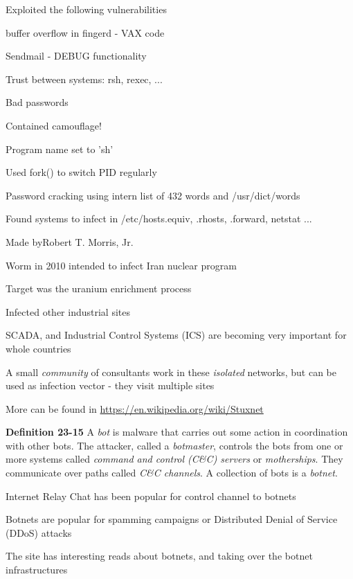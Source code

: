 \documentclass[Screen16to9,17pt]{foils}
\begin{document}

\begin{list1}
\item Exploited the following vulnerabilities
\begin{list2}
\item buffer overflow in fingerd - VAX code
\item Sendmail - DEBUG functionality
\item Trust between systems: rsh, rexec, ...
\item Bad passwords
\end{list2}
\item Contained camouflage!
\begin{list2}
\item Program name set to 'sh'
\item Used fork() to switch PID regularly
\item Password cracking using intern list of 432 words and /usr/dict/words
\item Found systems to infect in /etc/hosts.equiv, .rhosts, .forward, netstat ...
\end{list2}
\item Made byRobert T. Morris, Jr.
\end{list1}



\begin{list1}
\item Worm in 2010 intended to infect Iran nuclear program
\item Target was the uranium enrichment process
\item Infected other industrial sites
\item SCADA, and Industrial Control Systems (ICS) are becoming very important for whole countries
\item A small \emph{community} of consultants work in these \emph{isolated} networks, but can be used as infection vector - they visit multiple sites
\item More can be found in \url{https://en.wikipedia.org/wiki/Stuxnet}
\end{list1}





\begin{list1}
\item {\bf Definition 23-15} A \emph{bot} is malware that carries out some action in coordination with other bots. The attacker, called a \emph{botmaster}, controls the bots from one or more systems called \emph{command and control (C\&C) servers} or \emph{motherships}. They communicate over paths called \emph{C\&C channels}. A collection of bots is a \emph{botnet}.
\item Internet Relay Chat has been popular for control channel to botnets
\item Botnets are popular for spamming campaigns or Distributed Denial of Service (DDoS) attacks
\item The site  has interesting reads about botnets, and taking over the botnet infrastructures
\end{list1}
\end{document}
